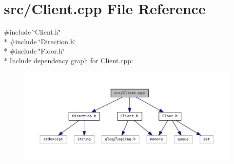 \section{src/\+Client.cpp File Reference}
\label{_client_8cpp}
{\ttfamily \#include \char`\"{}Client.\+h\char`\"{}}\\*
{\ttfamily \#include \char`\"{}Direction.\+h\char`\"{}}\\*
{\ttfamily \#include \char`\"{}Floor.\+h\char`\"{}}\\*
Include dependency graph for Client.\+cpp\+:\nopagebreak
\begin{figure}[H]
\begin{center}
\leavevmode
\includegraphics[width=350pt]{_client_8cpp__incl}
\end{center}
\end{figure}
